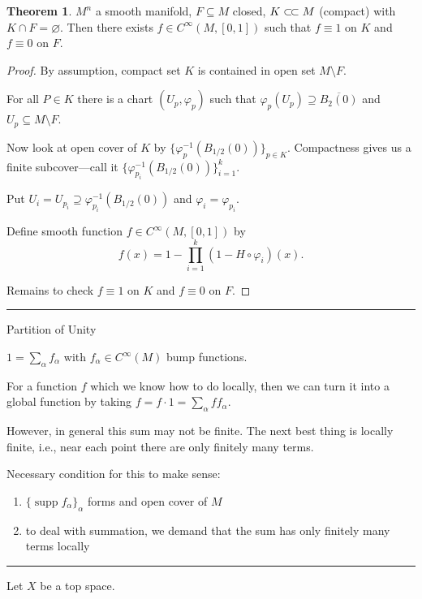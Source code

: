 \documentclass[12pt]{article}
\newcommand{\sepline}{\rule{\textwidth}{0.4pt}}
\theoremstyle{definition}
\newtheorem{theorem}{Theorem}
\renewcommand{\phi}{\varphi}
\renewcommand{\emptyset}{\varnothing}
\newcommand{\<}{\left\langle}
\renewcommand{\>}{\right\rangle}
\newcommand{\seq}{\subseteq}
\newcommand{\csub}{\subset\joinrel\subset}
\DeclareMathOperator{\supp}{supp}
\newcommand{\clo}{\overline}
\begin{document}
\begin{theorem}
    $M^n$ a smooth manifold, $F \seq M$ closed, $K \csub M$ (compact) with $K \cap F = \emptyset$.
    Then there exists $f \in C^\infty(M, [0, 1])$ such that $f \equiv 1$ on $K$ and $f \equiv 0$ on $F$.
\end{theorem}

\begin{proof}
    By assumption, compact set $K$ is contained in open set $M \setminus F$.

    For all $P \in K$ there is a chart $(U_p, \phi_p)$ such that $\phi_p(U_p) \supseteq \clo{B_2(0)}$ and $U_p \seq M \setminus F$.

    Now look at open cover of $K$ by $\{\phi_p^{-1}(B_{1/2}(0))\}_{p \in K}$.
    Compactness gives us a finite subcover---call it $\{\phi_{p_i}^{-1}(B_{1/2}(0))\}_{i=1}^{k}$.

    Put $U_i = U_{p_i} \supseteq \phi_{p_i}^{-1}(B_{1/2}(0))$ and $\phi_i = \phi_{p_i}$.

    Define smooth function $f \in C^\infty(M, [0, 1])$ by
    \[
        f(x) = 1 - \prod_{i=1}^{k}(1 - H \circ \phi_i)(x).
    \]

    Remains to check $f \equiv 1$ on $K$ and $f \equiv 0$ on $F$.



\end{proof}

\sepline

Partition of Unity

$1 = \sum_\alpha f_\alpha$ with $f_\alpha \in C^\infty(M)$ bump functions.

For a function $f$ which we know how to do locally, then we can turn it into a global function by taking $f = f \cdot 1 = \sum_\alpha ff_\alpha$.

However, in general this sum may not be finite.
The next best thing is locally finite, i.e., near each point there are only finitely many terms.

Necessary condition for this to make sense:
\begin{enumerate}
    \item $\{\supp f_\alpha\}_\alpha$ forms and open cover of $M$
    \item to deal with summation, we demand that the sum has only finitely many terms locally
\end{enumerate}

\sepline

Let $X$ be a top space.
\end{document}
